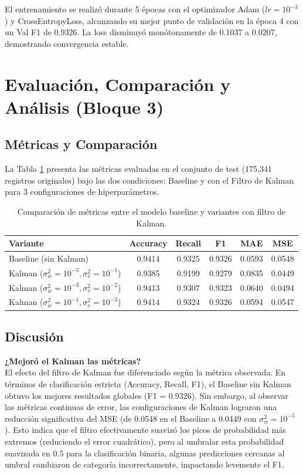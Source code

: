 \documentclass[12pt,a4paper]{article}
\begin{document}
El entrenamiento se realizó durante 5 épocas con el optimizador Adam ($lr=10^{-3}$) y CrossEntropyLoss, alcanzando su mejor punto de validación en la época 4 con un Val F1 de 0.9326. La loss disminuyó monótonamente de 0.1037 a 0.0207, demostrando convergencia estable.

\newpage
\section{Evaluación, Comparación y Análisis (Bloque 3)}

\subsection{Métricas y Comparación}

La Tabla \ref{tab:resultados} presenta las métricas evaluadas en el conjunto de test (175,341 registros originales) bajo las dos condiciones: Baseline y con el Filtro de Kalman para 3 configuraciones de hiperparámetros.

\begin{table}[htbp]
\centering
\begin{tabular}{lccccc}
\toprule
\textbf{Variante} & \textbf{Accuracy} & \textbf{Recall} & \textbf{F1} & \textbf{MAE} & \textbf{MSE} \\
\midrule
Baseline (sin Kalman) & 0.9414 & 0.9325 & 0.9326 & 0.0593 & 0.0548 \\
Kalman ($\sigma_w^2=10^{-5}, \sigma_v^2=10^{-1}$) & 0.9385 & 0.9199 & 0.9279 & 0.0835 & 0.0449 \\
Kalman ($\sigma_w^2=10^{-3}, \sigma_v^2=10^{-2}$) & 0.9413 & 0.9307 & 0.9323 & 0.0640 & 0.0494 \\
Kalman ($\sigma_w^2=10^{-1}, \sigma_v^2=10^{-3}$) & 0.9414 & 0.9324 & 0.9326 & 0.0594 & 0.0547 \\
\bottomrule
\end{tabular}
\caption{Comparación de métricas entre el modelo baseline y variantes con filtro de Kalman.}
\label{tab:resultados}
\end{table}

\subsection{Discusión}

\textbf{¿Mejoró el Kalman las métricas?}\\
El efecto del filtro de Kalman fue diferenciado según la métrica observada. En términos de clasificación estricta (Accuracy, Recall, F1), el Baseline sin Kalman obtuvo los mejores resultados globales (F1 = 0.9326). Sin embargo, al observar las métricas continuas de error, las configuraciones de Kalman lograron una reducción significativa del MSE (de 0.0548 en el Baseline a 0.0449 con $\sigma_w^2=10^{-5}$). Esto indica que el filtro efectivamente suavizó los picos de probabilidad más extremos (reduciendo el error cuadrático), pero al umbralar esta probabilidad suavizada en 0.5 para la clasificación binaria, algunas predicciones cercanas al umbral cambiaron de categoría incorrectamente, impactando levemente el F1.
\end{document}
